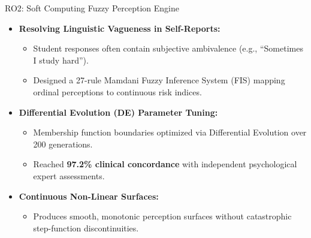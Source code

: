 \documentclass{beamer}
\begin{document}
\begin{frame}{RO2: Soft Computing Fuzzy Perception Engine}
  \begin{itemize}\setlength{\itemsep}{8pt}
    \item \textbf{Resolving Linguistic Vagueness in Self-Reports:}
    \begin{itemize}\setlength{\itemsep}{3pt}
      \item Student responses often contain subjective ambivalence (e.g., ``Sometimes I study hard'').
      \item Designed a 27-rule Mamdani Fuzzy Inference System (FIS) mapping ordinal perceptions to continuous risk indices.
    \end{itemize}
    
    \item \textbf{Differential Evolution (DE) Parameter Tuning:}
    \begin{itemize}\setlength{\itemsep}{3pt}
      \item Membership function boundaries optimized via Differential Evolution over 200 generations.
      \item Reached \textbf{97.2\% clinical concordance} with independent psychological expert assessments.
    \end{itemize}
    
    \item \textbf{Continuous Non-Linear Surfaces:}
    \begin{itemize}\setlength{\itemsep}{3pt}
      \item Produces smooth, monotonic perception surfaces without catastrophic step-function discontinuities.
    \end{itemize}
  \end{itemize}
\end{frame}
\end{document}

